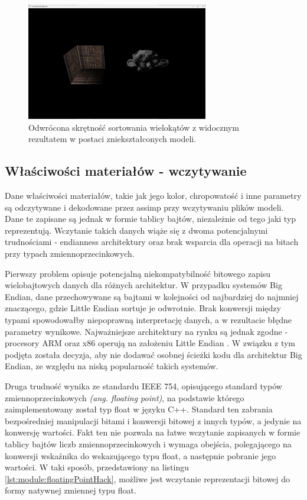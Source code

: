 \vfill

\begin{figure}[h!]
	\centering
	\includegraphics[width=300px]{images/impl/3_inverted_handiness.png}
	\caption{Odwrócona skrętność sortowania wielokątów z widocznym rezultatem w postaci zniekształconych modeli.}
	\label{Impl_InvertedHandiness}
\end{figure}


\subsection{Właściwości materiałów - wczytywanie}
Dane właściwości materiałów, takie jak jego kolor, chropowatość i inne parametry są odczytywane i dekodowane przez assimp przy wczytywaniu plików modeli. Dane te zapisane są jednak w formie tablicy bajtów, niezależnie od tego jaki typ reprezentują. Wczytanie takich danych wiąże się z dwoma potencjalnymi trudnościami - endianness architektury oraz brak wsparcia dla operacji na bitach przy typach zmiennoprzecinkowych.

Pierwszy problem opisuje potencjalną niekompatybilność bitowego zapisu wielobajtowych danych dla różnych architektur. W przypadku systemów Big Endian, dane przechowywane są bajtami w kolejności od najbardziej do najmniej znaczącego, gdzie Little Endian sortuje je odwrotnie. Brak konwersji między typami spowodowałby niepoprawną interpretację danych, a w rezultacie błędne parametry wynikowe. Najważniejsze architektury na rynku są jednak zgodne - procesory ARM oraz x86 operują na założeniu Little Endian \cite{ARM:Developer:Endianness} \cite{Oracle:HelpCenter:x86ByteOrdering}. W związku z tym podjęta została decyzja, aby nie dodawać osobnej ścieżki kodu dla architektur Big Endian, ze względu na niską popularność takich systemów.

Druga trudność wynika ze standardu IEEE 754, opisującego standard typów zmiennoprzecinkowych \textit{(ang. floating point)}, na podstawie którego zaimplementowany został typ float w języku C++. Standard ten zabrania bezpośredniej manipulacji bitami i konwersji bitowej z innych typów, a jedynie na konwersję wartości. Fakt ten nie pozwala na łatwe wczytanie zapisanych w formie tablicy bajtów liczb zmiennoprzecinkowych i wymaga obejścia, polegającego na konwersji wskaźnika do wskazującego typu float, a następnie pobranie jego wartości.  W taki sposób, przedstawiony na listingu \ref{lst:module:floatingPointHack}, możliwe jest wczytanie reprezentacji bitowej do formy natywnej zmiennej typu float.

